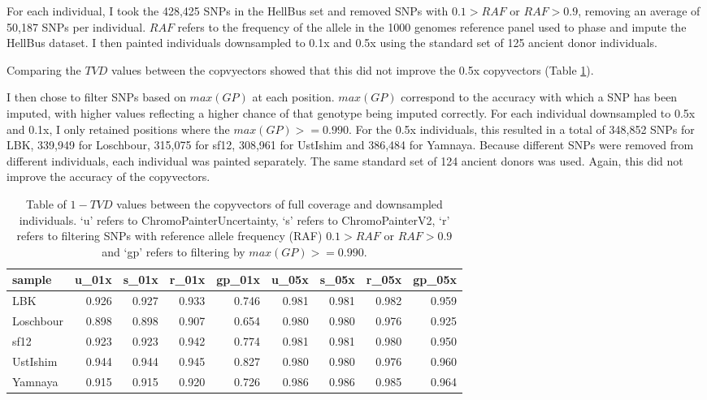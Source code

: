 {For each individual, I took the 428,425 SNPs in the HellBus set and removed SNPs with $0.1 > RAF$ or $RAF > 0.9$, removing an average of 50,187 SNPs per individual. $RAF$ refers to the frequency of the allele in the 1000 genomes reference panel used to phase and impute the HellBus dataset. I then painted individuals downsampled to 0.1x and 0.5x using the standard set of 125 ancient donor individuals.  

Comparing the $TVD$ values between the copvyectors showed that this did not improve the 0.5x copyvectors (Table \ref{tab:TVD_table}). 

I then chose to filter SNPs based on $max(GP)$ at each position. $max(GP)$ correspond to the accuracy with which a SNP has been imputed, with higher values reflecting a higher chance of that genotype being imputed correctly. For each individual downsampled to 0.5x and 0.1x, I only retained positions where the $max(GP) >= 0.990$. For the 0.5x individuals, this resulted in a total of 348,852 SNPs for LBK, 339,949 for Loschbour, 315,075 for sf12, 308,961 for UstIshim and 386,484 for Yamnaya. Because different SNPs were removed from different individuals, each individual was painted separately. The same standard set of 124 ancient donors was used. Again, this did not improve the accuracy of the copyvectors. 


\begin{table}
\centering
\begin{tabular}[t]{lrrrrrrrr}
\toprule
sample & u\_01x & s\_01x & r\_01x & gp\_01x & u\_05x & s\_05x & r\_05x & gp\_05x\\
\midrule
LBK & 0.926 & 0.927 & 0.933 & 0.746 & 0.981 & 0.981 & 0.982 & 0.959\\
Loschbour & 0.898 & 0.898 & 0.907 & 0.654 & 0.980 & 0.980 & 0.976 & 0.925\\
sf12 & 0.923 & 0.923 & 0.942 & 0.774 & 0.981 & 0.981 & 0.980 & 0.950\\
UstIshim & 0.944 & 0.944 & 0.945 & 0.827 & 0.980 & 0.980 & 0.976 & 0.960\\
Yamnaya & 0.915 & 0.915 & 0.920 & 0.726 & 0.986 & 0.986 & 0.985 & 0.964\\
\bottomrule
\end{tabular}
\caption{Table of $1-TVD$ values between the copyvectors of full coverage and downsampled individuals. `u' refers to ChromoPainterUncertainty, `s' refers to ChromoPainterV2, `r' refers to filtering SNPs with reference allele frequency (RAF) $0.1 > RAF$ or $RAF > 0.9$ and `gp' refers to filtering by $max(GP) >= 0.990$.}
\label{tab:TVD_table}
\end{table}


}
